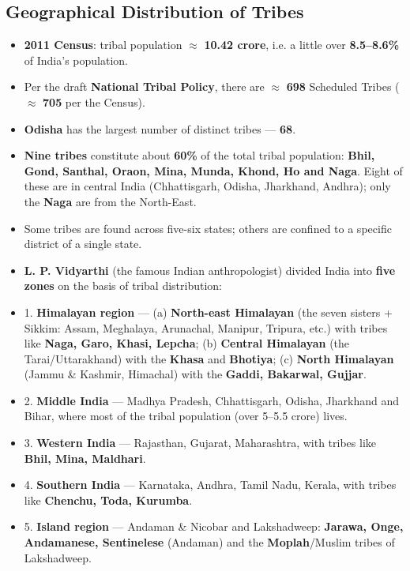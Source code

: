 \subsection{Geographical Distribution of Tribes}

\begin{DataFact}
\begin{itemize}
\item \textbf{2011 Census}: tribal population $\approx$ \textbf{10.42 crore}, i.e. a little over \textbf{8.5--8.6\%} of India's population.
\item Per the draft \textbf{National Tribal Policy}, there are $\approx$ \textbf{698} Scheduled Tribes ($\approx$ \textbf{705} per the Census).
\item \textbf{Odisha} has the largest number of distinct tribes --- \textbf{68}.
\item \textbf{Nine tribes} constitute about \textbf{60\%} of the total tribal population: \textbf{Bhil, Gond, Santhal, Oraon, Mina, Munda, Khond, Ho and Naga}. Eight of these are in central India (Chhattisgarh, Odisha, Jharkhand, Andhra); only the \textbf{Naga} are from the North-East.
\item Some tribes are found across five-six states; others are confined to a specific district of a single state.
\end{itemize}
\end{DataFact}

\begin{KeyConcept}
\begin{itemize}
\item \textbf{L. P. Vidyarthi} (the famous Indian anthropologist) divided India into \textbf{five zones} on the basis of tribal distribution:
\item 1. \textbf{Himalayan region} --- (a) \textbf{North-east Himalayan} (the seven sisters + Sikkim: Assam, Meghalaya, Arunachal, Manipur, Tripura, etc.) with tribes like \textbf{Naga, Garo, Khasi, Lepcha}; (b) \textbf{Central Himalayan} (the Tarai/Uttarakhand) with the \textbf{Khasa} and \textbf{Bhotiya}; (c) \textbf{North Himalayan} (Jammu \& Kashmir, Himachal) with the \textbf{Gaddi, Bakarwal, Gujjar}.
\item 2. \textbf{Middle India} --- Madhya Pradesh, Chhattisgarh, Odisha, Jharkhand and Bihar, where most of the tribal population (over 5--5.5 crore) lives.
\item 3. \textbf{Western India} --- Rajasthan, Gujarat, Maharashtra, with tribes like \textbf{Bhil, Mina, Maldhari}.
\item 4. \textbf{Southern India} --- Karnataka, Andhra, Tamil Nadu, Kerala, with tribes like \textbf{Chenchu, Toda, Kurumba}.
\item 5. \textbf{Island region} --- Andaman \& Nicobar and Lakshadweep: \textbf{Jarawa, Onge, Andamanese, Sentinelese} (Andaman) and the \textbf{Moplah}/Muslim tribes of Lakshadweep.
\end{itemize}
\end{KeyConcept}

